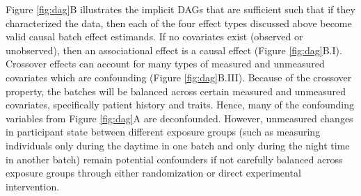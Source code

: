 Figure \ref{fig:dag}B illustrates the implicit DAGs that are sufficient such that if they characterized the data, then each of the four effect types discussed above become valid causal batch effect estimands. 
If no covariates exist (observed or unobserved), then an associational effect is a causal effect (Figure \ref{fig:dag}B.I). 
Crossover effects can account for many types of measured and unmeasured covariates which are confounding (Figure \ref{fig:dag}B.III). Because of the crossover property, the batches will be balanced across certain measured and unmeasured covariates, specifically patient history and traits. Hence, many of the confounding variables from Figure \ref{fig:dag}A are deconfounded. However, unmeasured changes in participant state between different exposure groups (such as measuring individuals only during the daytime in one batch and only during the night time in another batch) remain potential confounders if not carefully balanced across exposure groups through either randomization or direct experimental intervention. 

